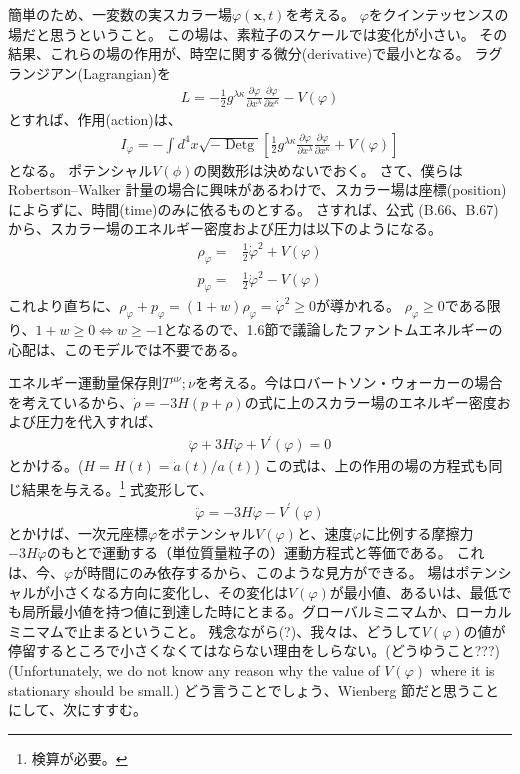 \documentclass[11pt]{ltjsarticle}
\theoremstyle{plain}
\theoremstyle{break}
\newcommand{\mbfx}{\mathbf{x}}
\begin{document}
簡単のため、一変数の実スカラー場$\varphi(\mbfx,t)$を考える。
$\varphi$をクインテッセンスの場だと思うということ。
この場は、素粒子のスケールでは変化が小さい。
その結果、これらの場の作用が、時空に関する微分(derivative)で最小となる。
ラグランジアン(Lagrangian)を
\begin{align}
  L = - \frac{1}{2} g^{\lambda \kappa} \frac{\partial \varphi}{\partial x^{\lambda}} \frac{\partial \varphi}{\partial x^{\kappa}}-V(\varphi)
\end{align}%
とすれば、作用(action)は、
\begin{align}
  I_{\varphi}=-\int d^{4} x \sqrt{-\operatorname{Detg}}\left[\frac{1}{2} g^{\lambda \kappa} \frac{\partial \varphi}{\partial x^{\lambda}} \frac{\partial \varphi}{\partial x^{\kappa}}+V(\varphi)\right]
\end{align}%
となる。
ポテンシャル$V(\phi)$の関数形は決めないでおく。
さて、僕らはRobertson–Walker 計量の場合に興味があるわけで、スカラー場は座標(position)によらずに、時間(time)のみに依るものとする。
さすれば、公式 (B.66、B.67) から、スカラー場のエネルギー密度および圧力は以下のようになる。
\begin{align}
  \rho_{\varphi}=&\frac{1}{2} \dot{\varphi}^{2}+V(\varphi) \label{eq:1.12.2}\\
   p_{\varphi}=&\frac{1}{2} \dot{\varphi}^{2}-V(\varphi) \label{eq:1.12.3}
\end{align}%
これより直ちに、$\rho_{\varphi}+p_{\varphi} = (1+w)\rho_{\varphi}  = \dot{\varphi}^2 \geq 0$が導かれる。
$\rho_{\varphi}\geq 0 $である限り、$1+w\geq0  \Leftrightarrow w \geq -1$となるので、1.6節で議論したファントムエネルギーの心配は、このモデルでは不要である。

エネルギー運動量保存則$T^{\mu\nu}{;\nu}$を考える。今はロバートソン・ウォーカーの場合を考えているから、$\dot{\rho} = -3H (p+\rho)$の式に上のスカラー場のエネルギー密度および圧力を代入すれば、
\begin{align}
  \ddot{\varphi}+3 H \dot{\varphi}+V^{\prime}(\varphi)=0 \label{eq:1.12.4}
\end{align}%
とかける。($H=H(t)=\dot{a}(t)/a(t)$)
この式は、上の作用の場の方程式も同じ結果を与える。\footnote{検算が必要。}
式変形して、
\begin{align}
  \ddot{\varphi}=-3 H \dot{\varphi}-  V^{\prime}(\varphi)
\end{align}%
とかけば、一次元座標$\varphi$をポテンシャル$V(\varphi)$と、速度$\dot{\varphi}$に比例する摩擦力$-3H\dot{\varphi}$のもとで運動する（単位質量粒子の）運動方程式と等価である。
これは、今、$\varphi$が時間にのみ依存するから、このような見方ができる。
場はポテンシャルが小さくなる方向に変化し、その変化は$V(\varphi)$が最小値、あるいは、最低でも局所最小値を持つ値に到達した時にとまる。グローバルミニマムか、ローカルミニマムで止まるということ。
残念ながら(?)、我々は、どうして$V(\varphi)$の値が停留するところで小さくなくてはならない理由をしらない。(どうゆうこと???)
(Unfortunately, we do not know any reason why the value of $V(\varphi)$ where it is stationary should be small.)
どう言うことでしょう、Wienberg 節だと思うことにして、次にすすむ。
\end{document}
